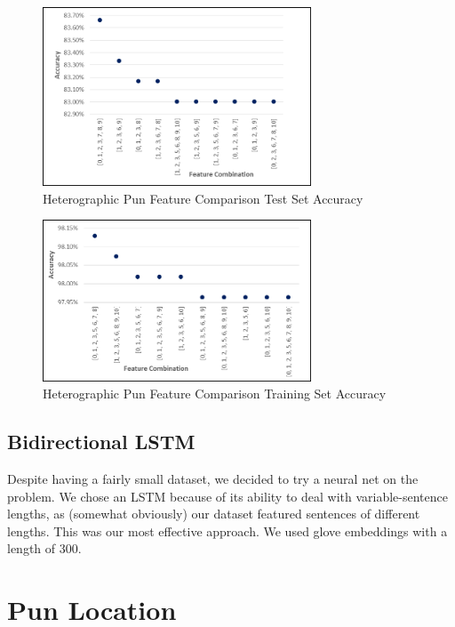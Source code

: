\documentclass{article}
\begin{document}
\begin{figure}
  \centering
  \includegraphics[width=8cm]{figures/Accuracy_on_Test_Set_for_Heterographic_Pun.png}
  \caption{Heterographic Pun Feature Comparison Test Set Accuracy}\label{fig:ACC_Test_Hetero}
\end{figure}

\begin{figure}
  \centering
  \includegraphics[width=8cm]{figures/Accuracy_on_Training_Set_for_Heterographic_Pun.png}
  \caption{Heterographic Pun Feature Comparison Training Set Accuracy}\label{fig:ACC_Train_Hetero}
\end{figure}

\subsection{Bidirectional LSTM}

Despite having a fairly small dataset, we decided to try a neural net on the
problem. We chose an LSTM because of its ability to deal with variable-sentence
lengths, as (somewhat obviously) our dataset featured sentences of different
lengths. This was our most effective approach. We used glove embeddings with a
length of 300.

\section{Pun Location}
\label{pun_location}
\end{document}

